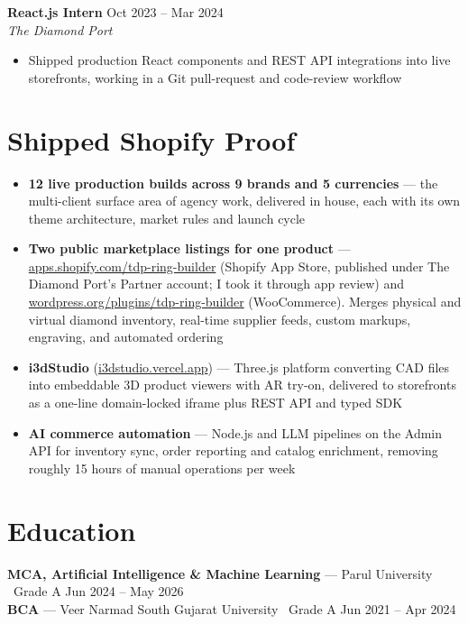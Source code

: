 \documentclass[10pt]{article}
\begin{document}
\vspace{1pt}

\textbf{React.js Intern} \hfill Oct 2023 -- Mar 2024 \\
\textit{The Diamond Port}
\begin{itemize}
  \item Shipped production React components and REST API integrations into live storefronts, working in a Git pull-request and code-review workflow
\end{itemize}

\section*{Shipped Shopify Proof}
\begin{itemize}
  \item \textbf{12 live production builds across 9 brands and 5 currencies} --- the multi-client surface area of agency work, delivered in house, each with its own theme architecture, market rules and launch cycle
  \item \textbf{Two public marketplace listings for one product} --- \href{https://apps.shopify.com/tdp-ring-builder}{apps.shopify.com/tdp-ring-builder} (Shopify App Store, published under The Diamond Port's Partner account; I took it through app review) and \href{https://wordpress.org/plugins/tdp-ring-builder/}{wordpress.org/plugins/tdp-ring-builder} (WooCommerce). Merges physical and virtual diamond inventory, real-time supplier feeds, custom markups, engraving, and automated ordering
  \item \textbf{i3dStudio} (\href{https://i3dstudio.vercel.app}{i3dstudio.vercel.app}) --- Three.js platform converting CAD files into embeddable 3D product viewers with AR try-on, delivered to storefronts as a one-line domain-locked iframe plus REST API and typed SDK
  \item \textbf{AI commerce automation} --- Node.js and LLM pipelines on the Admin API for inventory sync, order reporting and catalog enrichment, removing roughly 15 hours of manual operations per week
\end{itemize}

\section*{Education}
\textbf{MCA, Artificial Intelligence \& Machine Learning} --- Parul University \textbullet\ Grade A \hfill Jun 2024 -- May 2026 \\
\textbf{BCA} --- Veer Narmad South Gujarat University \textbullet\ Grade A \hfill Jun 2021 -- Apr 2024
\end{document}
